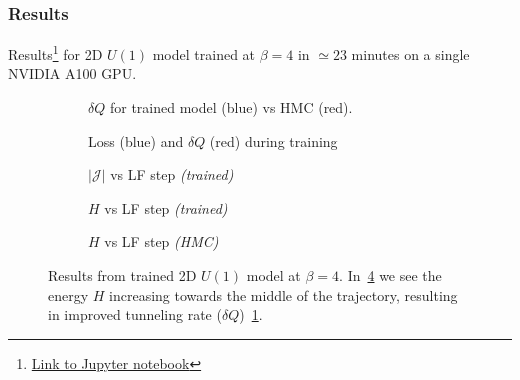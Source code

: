 \documentclass[a4paper,11pt]{article}
\begin{document}
\subsubsection{\label{subsubsec:2dResults}Results}
%
Results\footnote{\href{https://github.com/saforem2/l2hmc-qcd/blob/main/src/l2hmc/notebooks/l2hmc-2dU1.ipynb}{Link to Jupyter notebook}} for 2D $U(1)$ model trained at $\beta = 4$ in $\simeq 23$ minutes on a single NVIDIA A100 GPU.
%
%
\begin{figure}[htpb!]
    \centering
    \hfill
    \begin{subfigure}{0.4\textwidth}
        
        \caption{\label{subfig:dqhist}$\delta Q$ for trained model (blue) vs HMC (red).}
    \end{subfigure}
    \hfill
    \begin{subfigure}{0.55\textwidth}
        
        \caption{\label{subfig:loss_dQint}Loss (blue) and $\delta Q$ (red) during training}
    \end{subfigure}
    \hfill
    \begin{subfigure}{0.31\textwidth}
        
        \caption{\label{subfig:logdet2dU1}$|\mathcal{J}|$ vs LF step \emph{(trained)}}
    \end{subfigure}
    \hfill
    \begin{subfigure}{0.31\textwidth}
        
        \caption{\label{subfig:energy2dU1}$H$ vs LF step \emph{(trained)}}
    \end{subfigure}
    \hfill
    \begin{subfigure}{0.31\textwidth}
        
        \caption{\label{subfig:energy2dU1hmc}$H$ vs LF step \emph{(HMC)}}
    \end{subfigure}
    \hfill
    \caption{\label{fig:2dU1}Results from trained 2D $U(1)$ model at $\beta = 4$. In~\ref{subfig:energy2dU1} we see the energy $H$ increasing towards the middle of the trajectory, resulting in improved tunneling rate ($\delta Q$)~\ref{subfig:dqhist}.}
\end{figure}
\end{document}
